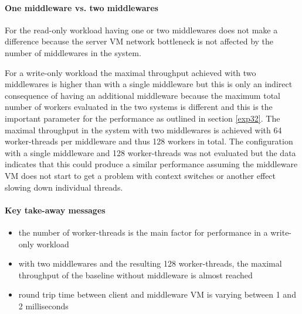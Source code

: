 \documentclass[report.tex]{subfiles}
\begin{document}
\paragraph{One middleware vs. two middlewares}

For the read-only workload having one or two middlewares does not make a difference because the server VM network bottleneck is not affected by the number of middlewares in the system.

For a write-only workload the maximal throughput achieved with two middlewares is higher than with a single middleware but  this is only an indirect consequence of having an additional middleware because the maximum total number of workers evaluated in the two systems is different and this is the important parameter for the performance as outlined in section \ref{exp32}. The maximal throughput in the system with two middlewares is achieved with 64 worker-threads per middleware and thus 128 workers in total. The configuration with a single middleware and 128 worker-threads was not evaluated but the data indicates that this could produce a similar performance assuming the middleware VM does not start to get a problem with context switches or another effect slowing down individual threads.

\paragraph{Key take-away messages}
\begin{itemize}
	\vitemsep
	\item the number of worker-threads is the main factor for performance in a write-only workload
	\item with two middlewares and the resulting 128 worker-threads, the maximal throughput of the baseline without middleware is almost reached
	\item round trip time between client and middleware VM is varying between 1 and 2 milliseconds
\end{itemize}
\end{document}
